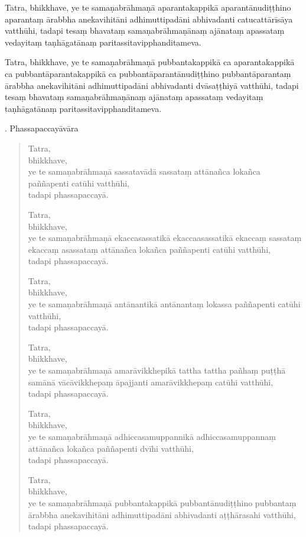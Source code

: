 \documentclass[11pt,twoside,openright]{book}
\begin{document}
\pstart
Tatra, bhikkhave, ye te samaṇabrāhmaṇā aparantakappikā aparantānudiṭṭhino aparantaṃ ārabbha anekavihitāni adhimuttipadāni abhivadanti catucattārīsāya vatthūhi, tadapi tesaṃ bhavataṃ samaṇabrāhmaṇānaṃ ajānataṃ apassataṃ vedayitaṃ taṇhāgatānaṃ paritassitavipphanditameva.
\pend

\pstart
Tatra, bhikkhave, ye te samaṇabrāhmaṇā pubbantakappikā ca aparantakappikā ca pubbantāparantakappikā ca pubbantāparantānudiṭṭhino pubbantāparantaṃ ārabbha anekavihitāni adhimuttipadāni abhivadanti dvāsaṭṭhiyā vatthūhi, tadapi tesaṃ bhavataṃ samaṇabrāhmaṇānaṃ ajānataṃ apassataṃ vedayitaṃ taṇhāgatānaṃ paritassitavipphanditameva.
\pend

. Phassapaccayāvāra
\pend

\begin{verse}
Tatra,\\
\vin  bhikkhave,\\
\vin  ye te samaṇabrāhmaṇā sassatavādā sassataṃ attānañca lokañca paññapenti catūhi vatthūhi,\\
\vin  tadapi phassapaccayā.

Tatra,\\
\vin  bhikkhave,\\
\vin  ye te samaṇabrāhmaṇā ekaccasassatikā ekaccaasassatikā ekaccaṃ sassataṃ ekaccaṃ asassataṃ attānañca lokañca paññapenti catūhi vatthūhi,\\
\vin  tadapi phassapaccayā.

Tatra,\\
\vin  bhikkhave,\\
\vin  ye te samaṇabrāhmaṇā antānantikā antānantaṃ lokassa paññapenti catūhi vatthūhi,\\
\vin  tadapi phassapaccayā.

Tatra,\\
\vin  bhikkhave,\\
\vin  ye te samaṇabrāhmaṇā amarāvikkhepikā tattha tattha pañhaṃ puṭṭhā samānā vācāvikkhepaṃ āpajjanti amarāvikkhepaṃ catūhi vatthūhi,\\
\vin  tadapi phassapaccayā.

Tatra,\\
\vin  bhikkhave,\\
\vin  ye te samaṇabrāhmaṇā adhiccasamuppannikā adhiccasamuppannaṃ attānañca lokañca paññapenti dvīhi vatthūhi,\\
\vin  tadapi phassapaccayā.

Tatra,\\
\vin  bhikkhave,\\
\vin  ye te samaṇabrāhmaṇā pubbantakappikā pubbantānudiṭṭhino pubbantaṃ ārabbha anekavihitāni adhimuttipadāni abhivadanti aṭṭhārasahi vatthūhi,\\
\vin  tadapi phassapaccayā.


\end{verse}
\end{document}
